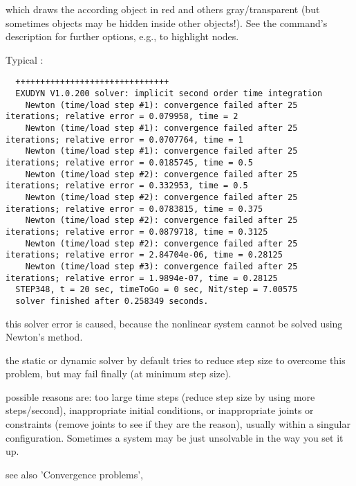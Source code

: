 %
which draws the according object in red and others gray/transparent (but sometimes objects may be hidden inside other objects!). See the command's description for further options, e.g., to highlight nodes.
\vspace{12pt}\\
\item Typical :
\plainlststyle
\begin{lstlisting}
  +++++++++++++++++++++++++++++++
  EXUDYN V1.0.200 solver: implicit second order time integration
    Newton (time/load step #1): convergence failed after 25 iterations; relative error = 0.079958, time = 2
    Newton (time/load step #1): convergence failed after 25 iterations; relative error = 0.0707764, time = 1
    Newton (time/load step #1): convergence failed after 25 iterations; relative error = 0.0185745, time = 0.5
    Newton (time/load step #2): convergence failed after 25 iterations; relative error = 0.332953, time = 0.5
    Newton (time/load step #2): convergence failed after 25 iterations; relative error = 0.0783815, time = 0.375
    Newton (time/load step #2): convergence failed after 25 iterations; relative error = 0.0879718, time = 0.3125
    Newton (time/load step #2): convergence failed after 25 iterations; relative error = 2.84704e-06, time = 0.28125
    Newton (time/load step #3): convergence failed after 25 iterations; relative error = 1.9894e-07, time = 0.28125
  STEP348, t = 20 sec, timeToGo = 0 sec, Nit/step = 7.00575
  solver finished after 0.258349 seconds.
\end{lstlisting}
%
\bi
\item[$\ra$] this solver error is caused, because the nonlinear system cannot be solved using Newton's method.
\item[$\ra$] the static or dynamic solver by default tries to reduce step size to overcome this problem, but may fail finally (at minimum step size).
\item[$\ra$] possible reasons are: too large time steps (reduce step size by using more steps/second), inappropriate initial conditions, or inappropriate joints or constraints (remove joints to see if they are the reason), usually within a singular configuration. Sometimes a system may be just unsolvable in the way you set it up.
\item[$\ra$] see also 'Convergence problems', 
